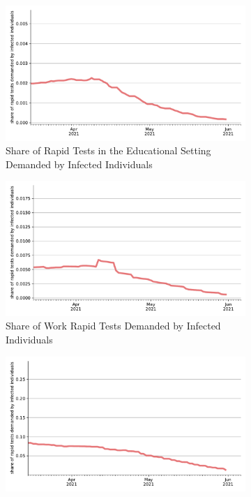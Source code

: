 \begin{figure}[ht]
  \centering
  \begin{subfigure}[b]{0.425\textwidth}
    \centering
    \includegraphics[width=\textwidth]{figures/results/figures/rapid_test_statistics/share_infected_among_educ_demand}
    \caption{Share of Rapid Tests in the Educational Setting Demanded by Infected
    Individuals}
    \label{fig:share_infected_among_educ_rapid_test_demand}
  \end{subfigure}
  \hfill
  \begin{subfigure}[b]{0.425\textwidth}
    \centering
    \includegraphics[width=\textwidth]{figures/results/figures/rapid_test_statistics/share_infected_among_work_demand}
    \caption{Share of Work Rapid Tests Demanded by Infected Individuals}
    \label{fig:share_infected_among_work_rapid_test_demand}
  \end{subfigure}
  \hfill
  \begin{subfigure}[b]{0.425\textwidth}
    \centering
    \includegraphics[width=\textwidth]{figures/results/figures/rapid_test_statistics/share_infected_among_private_demand}

\end{subfigure}
\end{figure}
